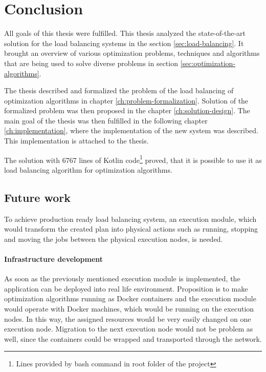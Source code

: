 \chapter{Conclusion}\label{ch:conclusion}
All goals of this thesis were fulfilled.
This thesis analyzed the state-of-the-art solution for the load balancing systems in the section \ref{sec:load-balancing}. 
It brought an overview of various optimization problems, techniques and algorithms 
that are being used to solve diverse problems in section \ref{sec:optimization-algorithms}.

The thesis described and formalized the problem of the load balancing of optimization algorithms in chapter \ref{ch:problem-formalization}.
Solution of the formalized problem was then proposed in the chapter \ref{ch:solution-design}.
The main goal of the thesis was then fulfilled in the following chapter \ref{ch:implementation},
where the implementation of the new system was described.
This implementation is attached to the thesis.

The solution with 6767 lines of Kotlin 
code\footnote{Lines provided by  bash command in root folder of the project} 
proved, that it is possible to use it as load balancing algorithm for optimization algorithms.

\section{Future work}\label{sec:future-work}
To achieve production ready load balancing system,
an execution module, 
which would transform the created plan into physical actions 
such as running, stopping and moving the jobs between the physical execution nodes,
is needed.

\subsubsection{Infrastructure development}
As soon as the previously mentioned execution module is implemented,
the application can be deployed into real life environment.
Proposition is to make optimization algorithms running as Docker containers 
and the execution module would operate with Docker machines,
which would be running on the execution nodes. 
In this way, 
the assigned resources would be very easily changed on one execution node.
Migration to the next execution node would not be problem as well, 
since the containers could be wrapped and transported through the network.

